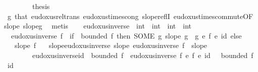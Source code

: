 \begin{isabellebody}
\ \ \isacommand{{\isacharbraceright}{\kern0pt}}\isamarkupfalse%
\isanewline
\ \ \isamarkupfalse%
\ \isamarkupfalse%
\ {\isacharquery}{\kern0pt}thesis\ \isamarkupfalse%
\ g\ that\ eudoxus{\isacharunderscore}{\kern0pt}rel{\isacharunderscore}{\kern0pt}trans\ eudoxus{\isacharunderscore}{\kern0pt}times{\isacharunderscore}{\kern0pt}cong\ slope{\isacharunderscore}{\kern0pt}reflI\ eudoxus{\isacharunderscore}{\kern0pt}times{\isacharunderscore}{\kern0pt}commute{\isacharbrackleft}{\kern0pt}OF\ slope\ slope{\isacharunderscore}{\kern0pt}g{\isacharbrackright}{\kern0pt}\ \isamarkupfalse%
\ metis\isanewline
{}\isamarkupfalse%
%
\endisatagproof
{\isafoldproof}%
%
\isadelimproof
\ \ \isanewline
%
\endisadelimproof
\isanewline
{}\isamarkupfalse%
\ eudoxus{\isacharunderscore}{\kern0pt}inverse\ {\isacharcolon}{\kern0pt}{\isacharcolon}{\kern0pt}\ {\isachardoublequoteopen}{\isacharparenleft}{\kern0pt}int\ {\isasymRightarrow}\ int{\isacharparenright}{\kern0pt}\ {\isasymRightarrow}\ {\isacharparenleft}{\kern0pt}int\ {\isasymRightarrow}\ int{\isacharparenright}{\kern0pt}{\isachardoublequoteclose}\ \isanewline
\ \ {\isachardoublequoteopen}eudoxus{\isacharunderscore}{\kern0pt}inverse\ f\ {\isacharequal}{\kern0pt}\ {\isacharparenleft}{\kern0pt}if\ {\isasymnot}\ bounded\ f\ then\ SOME\ g{\isachardot}{\kern0pt}\ slope\ g\ {\isasymand}\ {\isacharparenleft}{\kern0pt}g\ {\isacharasterisk}{\kern0pt}\isactrlsub e\ f{\isacharparenright}{\kern0pt}\ {\isasymsim}\isactrlsub e\ id\ else\ {\isacharparenleft}{\kern0pt}{\isasymlambda}{\isacharunderscore}{\kern0pt}{\isachardot}{\kern0pt}\ {}{\isacharparenright}{\kern0pt}{\isacharparenright}{\kern0pt}{\isachardoublequoteclose}\isanewline
\isanewline
{}\isamarkupfalse%
\ \isanewline
\ \ \ {\isachardoublequoteopen}slope\ f{\isachardoublequoteclose}\isanewline
\ \ \ slope{\isacharunderscore}{\kern0pt}eudoxus{\isacharunderscore}{\kern0pt}inverse{\isacharcolon}{\kern0pt}\ {\isachardoublequoteopen}slope\ {\isacharparenleft}{\kern0pt}eudoxus{\isacharunderscore}{\kern0pt}inverse\ f{\isacharparenright}{\kern0pt}{\isachardoublequoteclose}\ {\isacharparenleft}{\kern0pt}\ {\isachardoublequoteopen}{\isacharquery}{\kern0pt}slope{\isachardoublequoteclose}{\isacharparenright}{\kern0pt}\ \isanewline
\ \ \ \ \ \ \ \ eudoxus{\isacharunderscore}{\kern0pt}inverse{\isacharunderscore}{\kern0pt}id{\isacharcolon}{\kern0pt}\ {\isachardoublequoteopen}{\isasymnot}\ bounded\ f\ {\isasymLongrightarrow}\ eudoxus{\isacharunderscore}{\kern0pt}inverse\ f\ {\isacharasterisk}{\kern0pt}\isactrlsub e\ f\ {\isasymsim}\isactrlsub e\ id{\isachardoublequoteclose}\ {\isacharparenleft}{\kern0pt}\ {\isachardoublequoteopen}{\isasymnot}\ bounded\ f\ {\isasymLongrightarrow}\ {\isacharquery}{\kern0pt}id{\isachardoublequoteclose}{\isacharparenright}{\kern0pt}\isanewline

\end{isabellebody}
